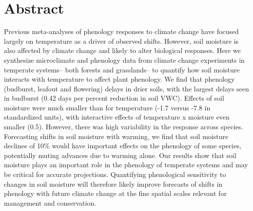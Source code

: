 \documentclass{article}
\begin{document}






\linenumbers

\section*{Abstract}
Previous meta-analyses of phenology responses to climate change have focused largely on temperature as a driver of observed shifts. However, soil moisture is also affected by climate change and likely to alter biological responses. Here we synthesize microclimate and phenology data from climate change experiments in temperate systems-- both forests and grasslands-- to quantify how soil moisture interacts with temperature to affect plant phenology. 
We find that phenology (budburst, leafout and flowering) delays in drier soils, with the largest delays seen in budburst (0.42 days per percent reduction in soil VWC). Effects of soil moisture were much smaller than for temperature (-1.7 versus -7.8 in standardized units), with interactive effects of temperature x moisture even smaller (0.5). However, there was high variability in the response across species. Forecasting shifts in soil moisture with warming, we find that soil moisture declines of 10\% would have important effects on the phenology of some species, potentially muting advances due to warming alone. Our results show that soil moisture plays an important role in the phenology of temperate systems and may be critical for accurate projections. Quantifying phenological sensitivity to changes in soil moisture will therefore likely improve forecasts of shifts in phenology with future climate change at the fine spatial scales relevant for management and conservation.


\newpage
\end{document}
